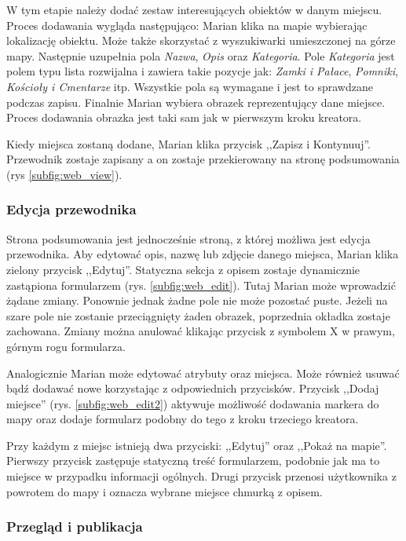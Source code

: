 \documentclass{book}
\begin{document}
			W tym etapie należy dodać zestaw interesujących obiektów w danym miejscu. Proces dodawania wygląda następująco: Marian klika na mapie wybierając lokalizację obiektu. Może także skorzystać z wyszukiwarki umieszczonej na górze mapy. Następnie uzupełnia pola \textit{Nazwa}, \textit{Opis} oraz \textit{Kategoria}. Pole \textit{Kategoria} jest polem typu lista rozwijalna i zawiera takie pozycje jak: \textit{Zamki i Pałace}, \textit{Pomniki}, \textit{Kościoły i Cmentarze} itp. Wszystkie pola są wymagane i jest to sprawdzane podczas zapisu.
			Finalnie Marian wybiera obrazek reprezentujący dane miejsce. Proces dodawania obrazka jest taki sam jak w pierwszym kroku kreatora.
			
			Kiedy miejsca zostaną dodane, Marian klika przycisk ,,Zapisz i Kontynuuj''. Przewodnik zostaje zapisany a on zostaje przekierowany na stronę podsumowania (rys \ref{subfig:web_view}).
			
			\subsubsection{Edycja przewodnika}
			
			Strona podsumowania jest jednocześnie stroną, z której możliwa jest edycja przewodnika. Aby edytować opis, nazwę lub zdjęcie danego miejsca, Marian klika zielony przycisk ,,Edytuj''. Statyczna sekcja z opisem zostaje dynamicznie zastąpiona formularzem (rys. \ref{subfig:web_edit}). Tutaj Marian może wprowadzić żądane zmiany. Ponownie jednak żadne pole nie może pozostać puste. Jeżeli na szare pole nie zostanie przeciągnięty żaden obrazek, poprzednia okładka zostaje zachowana. Zmiany można anulować klikając przycisk z symbolem X w prawym, górnym rogu formularza. 
			
			Analogicznie Marian może edytować atrybuty oraz miejsca. Może również usuwać bądź dodawać nowe korzystając z odpowiednich przycisków. Przycisk ,,Dodaj miejsce'' (rys. \ref{subfig:web_edit2}) aktywuje możliwość dodawania markera do mapy oraz dodaje formularz podobny do tego z kroku trzeciego kreatora. 
			
			Przy każdym z miejsc istnieją dwa przyciski: ,,Edytuj'' oraz ,,Pokaż na mapie''. Pierwszy przycisk zastępuje statyczną treść formularzem, podobnie jak ma to miejsce w przypadku informacji ogólnych. Drugi przycisk przenosi użytkownika z powrotem do mapy i oznacza wybrane miejsce chmurką z opisem. 
			
			\subsubsection{Przegląd i publikacja}
		
\end{document}
